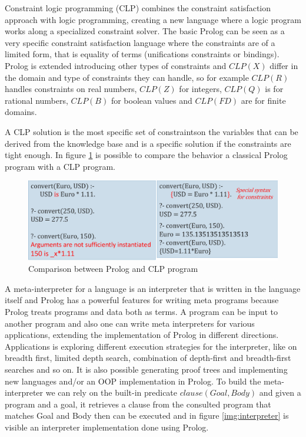 Constraint logic programming (CLP) combines the constraint satisfaction approach with 
logic programming, creating a new language where a logic program works along a specialized
constraint solver.\newline
The basic Prolog can be seen as a very specific constraint satisfaction language where 
the constraints are of a limited form, that is equality of terms 
(unifications constraints or bindings).\newline
Prolog is extended introducing other types of constraints and $CLP(X)$ differ 
in the domain and type of constraints they can handle, so for example $CLP(R)$ handles 
constraints on real numbers, $CLP(Z)$ for integers, $CLP(Q)$ is for rational numbers,
$CLP(B)$ for boolean values and $CLP(FD)$ are for finite domains.

A CLP solution is the most specific set of constraintson the variables that can be derived
from the knowledge base and is a specific solution if the constraints are tight enough.\newline
In figure \ref{img:constraintsProlog} is possible to compare the behavior a classical Prolog
program with a CLP program.

\begin{figure}
	\includegraphics[width=\textwidth]{Images/constraintsProlog}
	\caption{Comparison between Prolog and CLP program}
	\label{img:constraintsProlog}
\end{figure}
A meta-interpreter for a language is an interpreter that is written in the language itself and
Prolog has a powerful features for writing meta programs because Prolog treats programs
and data both as terms.\newline
A program can be input to another program and also one can write meta interpreters 
for various applications, extending the implementation of Prolog in different directions.\newline
Applications is exploring different execution strategies for the interpreter, like 
on breadth first, limited depth search, combination of depth-first and breadth-first searches and
so on.\newline
It is also possible generating proof trees and implementing new languages and/or an OOP 
implementation in Prolog.\newline
To build the meta-interpreter we can rely on the built-in predicate $clause(Goal, Body)$ and 
given a program and a goal, it retrieves a clause from the consulted program that matches 
Goal and Body then can be executed and in figure \ref{img:interpreter} is visible an 
interpreter implementation done using Prolog.

